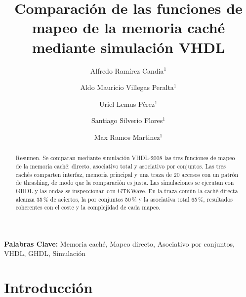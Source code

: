 \documentclass[llncs]{llncs}
\begin{document}
\title{Comparación de las funciones de mapeo de la memoria caché\\
mediante simulación VHDL}

\author{Alfredo Ramírez Candia$^{1}$%
\and Aldo Mauricio Villegas Peralta$^{1}$%
\and Uriel Lemus Pérez$^{1}$%
\and Santiago Silverio Flores$^{1}$%
\and Max Ramos Martinez$^{1}$}


\maketitle

\begin{abstract}
Resumen. Se comparan mediante simulación VHDL-2008 las tres funciones
de mapeo de la memoria caché: directo, asociativo total y asociativo
por conjuntos. Las tres cachés comparten interfaz, memoria principal
y una traza de 20 accesos con un patrón de thrashing, de modo que la
comparación es justa. Las simulaciones se ejecutan con GHDL y las
ondas se inspeccionan con GTKWave. En la traza común la caché directa
alcanza 35\,\% de aciertos, la por conjuntos 50\,\% y la asociativa
total 65\,\%, resultados coherentes con el coste y la complejidad de
cada mapeo.
\end{abstract}

\noindent\textbf{Palabras Clave:} Memoria caché, Mapeo directo,
Asociativo por conjuntos, VHDL, GHDL, Simulación

\section{Introducción}
\label{sec:intro}
\end{document}
